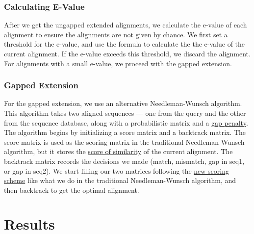 \documentclass{article}
\begin{document}
\subsubsection*{Calculating E-Value}
After we get the ungapped extended alignments, we calculate the e-value of each alignment to ensure the alignments are not given by chance. We first set a threshold for the e-value, and use the formula to calculate the the e-value of the current alignment. If the e-value exceeds this threshold, we discard the alignment. For alignments with a small e-value, we proceed with the gapped extension.

\subsubsection*{Gapped Extension}
For the gapped extension, we use an alternative Needleman-Wunsch algorithm. This algorithm takes two aligned sequences --- one from the query and the other from the sequence database, along with a probabilistic matrix and a \hyperref[sec:gap]{gap penalty}. The algorithm begins by initializing a score matrix and a backtrack matrix. The score matrix is used as the scoring matrix in the traditional Needleman-Wunsch algorithm, but it stores the \hyperref[sec:nucprob]{score of similarity} of the current alignment. The backtrack matrix records the decisions we made (match, mismatch, gap in seq1, or gap in seq2). We start filling our two matrices following the \hyperref[sec:scoring]{new scoring scheme} like what we do in the traditional Needleman-Wunsch algorithm, and then backtrack to get the optimal alignment. \\

\section*{Results}
\end{document}

